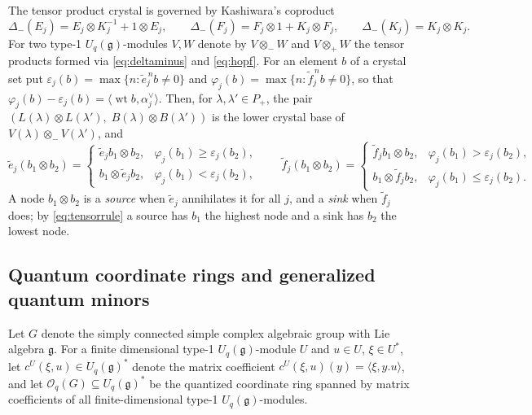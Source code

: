 \documentclass[12pt]{amsart}
\theoremstyle{plain}
\theoremstyle{remark}
\newcommand{\g}{\mathfrak{g}}
\newcommand{\Uq}{U_q(\g)}
\newcommand{\wt}{\operatorname{wt}}
\newcommand{\ot}{\otimes}
\begin{document}
The tensor product crystal is governed by Kashiwara's coproduct
\begin{equation}\label{eq:deltaminus}
\Delta_-(E_j)=E_j\ot K_j^{-1}+1\ot E_j,\qquad
\Delta_-(F_j)=F_j\ot1+K_j\ot F_j,\qquad
\Delta_-(K_j)=K_j\ot K_j.
\end{equation}
For two type-1 $\Uq$-modules $V,W$ denote by $V\ot_- W$ and $V\ot_+ W$ the tensor products formed via
\eqref{eq:deltaminus} and \eqref{eq:hopf}. For an element $b$ of a crystal set put
$\varepsilon_j(b)=\max\{n:\tilde e_j^{\,n}b\neq0\}$ and
$\varphi_j(b)=\max\{n:\tilde f_j^{\,n}b\neq0\}$, so that
$\varphi_j(b)-\varepsilon_j(b)=\langle\wt b,\alpha_j^\vee\rangle$. Then, for
$\lambda,\lambda'\in P_+$, the pair
$(L(\lambda)\ot L(\lambda'),\;B(\lambda)\ot B(\lambda'))$ is the lower crystal base of
$V(\lambda)\ot_-V(\lambda')$, and
\begin{equation}\label{eq:tensorrule}
\tilde e_j(b_1\ot b_2)=
\begin{cases}\tilde e_j b_1\ot b_2,&\varphi_j(b_1)\ge\varepsilon_j(b_2),\\
b_1\ot\tilde e_j b_2,&\varphi_j(b_1)<\varepsilon_j(b_2),\end{cases}
\qquad
\tilde f_j(b_1\ot b_2)=
\begin{cases}\tilde f_j b_1\ot b_2,&\varphi_j(b_1)>\varepsilon_j(b_2),\\
b_1\ot\tilde f_j b_2,&\varphi_j(b_1)\le\varepsilon_j(b_2).\end{cases}
\end{equation}
A node $b_1\ot b_2$ is a \emph{source} when $\tilde e_j$ annihilates it for all $j$,
and a \emph{sink} when $\tilde f_j$ does; by \eqref{eq:tensorrule} a source has $b_1$
the highest node and a sink has $b_2$ the lowest node.

\subsection{Quantum coordinate rings and generalized quantum minors}\label{ss:oq}

Let $G$ denote the simply connected simple complex algebraic group with Lie
algebra $\g$. For a finite dimensional type-1 $\Uq$-module $U$ and $u\in U$, $\xi\in U^*$, let
$c^{U}(\xi,u)\in\Uq^*$ denote the matrix coefficient $c^U(\xi,u)(y)=\langle\xi,y.u
\rangle$, and let $\mathcal{O}_q(G)\subseteq\Uq^*$ be the quantized coordinate ring spanned by matrix coefficients of all finite-dimensional type-1 $\Uq$-modules.
\end{document}
